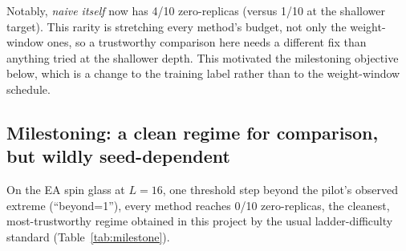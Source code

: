 \documentclass[a4paper,fleqn]{cas-sc}
\begin{document}
Notably, \emph{naive itself} now has 4/10 zero-replicas (versus 1/10 at the shallower
target). This rarity is stretching every method's budget, not only the weight-window
ones, so a trustworthy comparison here needs a different fix than anything tried at the
shallower depth. This motivated the milestoning objective below, which is a change to the
training label rather than to the weight-window schedule.

\subsection{Milestoning: a clean regime for comparison, but wildly seed-dependent}\label{sec:milestone}
On the EA spin glass at $L=16$, one threshold step beyond the pilot's observed extreme
(``beyond=1''), every method reaches 0/10 zero-replicas, the cleanest,
most-trustworthy regime obtained in this project by the usual ladder-difficulty standard
(Table~\ref{tab:milestone}).
\end{document}

